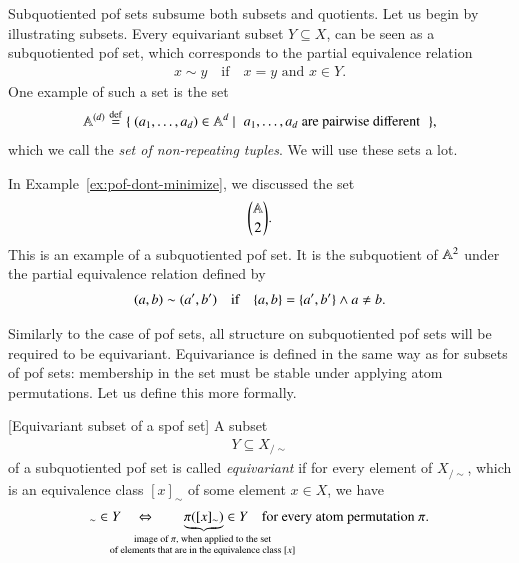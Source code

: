     \begin{myexample}\label{ex:subquotiented-as-subsets} Subquotiented pof sets subsume both subsets and quotients. Let us begin by illustrating subsets.
        Every equivariant subset $Y \subseteq X$, can be seen as a subquotiented pof set, which corresponds to the partial equivalence relation 
        \begin{align*}
            x \sim y \quad \text{if} \quad x = y \text{ and } x \in Y.
        \end{align*}
        One example of such a set is the set
        \begin{align*}
        \atoms^{(d)} \eqdef 
        \setbuild{(a_1,\ldots,a_d) \in \atoms^d}{$a_1,\ldots,a_d$ are pairwise different},
        \end{align*} 
        which we call the \emph{set of non-repeating tuples}. We will use these sets a lot.
    \end{myexample}


\begin{myexample}\label{ex:atoms-choose-two}
    In Example~\ref{ex:pof-dont-minimize}, we discussed the set 
    \begin{align*}
    {\mathbb A\choose 2}.
    \end{align*}
    This is an example of a subquotiented pof set. It is the subquotient of $\mathbb A^2$ under the partial equivalence relation defined by 
    \begin{align*}
    (a,b) \sim (a',b') \quad \text{if} \quad \{a,b\} = \{a',b'\} \land a \neq b.
    \end{align*}
\end{myexample}

Similarly to the case of pof sets, all structure on subquotiented pof sets will be required to be equivariant. Equivariance is defined in the same way as for subsets of pof sets: membership in the set must be stable under applying atom permutations. Let us define this more formally.

\begin{definition}\label{def:equivariant-subset-of-a-spof}[Equivariant subset of a spof set]
    A subset 
    \begin{align*}
    Y \subseteq X_{/\sim}
    \end{align*}
    of a subquotiented pof set is called \emph{equivariant} if for every element of $X_{/\sim}$, which is an equivalence class $[x]_\sim$ of some element $x \in X$, we have 
    \begin{align*}
    [x]_\sim \in Y \quad \Leftrightarrow \qquad \myunderbrace{\pi([x]_\sim)}{image of $\pi$, when applied to  the set \\ of elements that are in the equivalence class $[x]$} \in Y \quad \text{for every atom permutation $\pi$}.
    \end{align*}
\end{definition}

